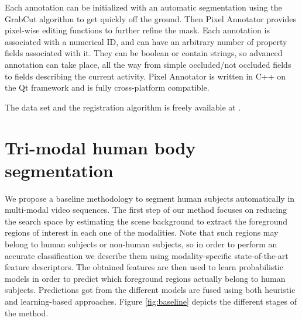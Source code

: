 \documentclass[10pt,twocolumn,letterpaper]{article}
\begin{document}
Each annotation can be initialized with an automatic segmentation using the GrabCut algorithm \cite{rother2004grabcut} to get quickly off the ground. Then Pixel Annotator provides pixel-wise editing functions to further refine the mask. Each annotation is associated with a numerical ID, and can have an arbitrary number of property fields associated with it. They can be boolean or contain strings, so advanced annotation can take place, all the way from simple occluded/not occluded fields to fields describing the current activity. Pixel Annotator is written in C++ on the Qt framework and is fully cross-platform compatible.

The data set and the registration algorithm is freely available at \cite{vapgroup}.


\section{Tri-modal human body segmentation}
\label{sec:trimodalhumanbodysegmentation}


We propose a baseline methodology to segment human subjects automatically in multi-modal video sequences. The first step of our method focuses on reducing the search space by estimating the scene background to extract the foreground regions of interest in each one of the modalities. Note that such regions may belong to human subjects or non-human subjects, so in order to perform an accurate classification we describe them using  modality-specific state-of-the-art feature descriptors. The obtained features are then used to learn probabilistic models in order to predict which foreground regions actually belong to human subjects. Predictions got from the different models are fused using both heuristic and learning-based approaches. Figure \ref{fig:baseline} depicts the different stages of the method.
\end{document}
